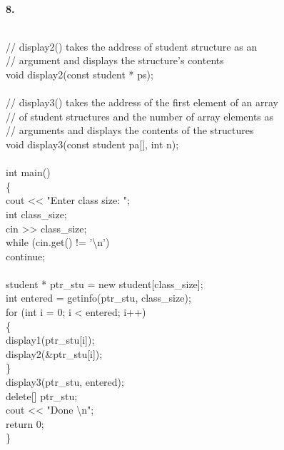 \documentclass[10 pt]{amsart}
\newlength{\cwidth}
\newenvironment{cpart}[2][\cwidth]
	{\\ \phantom{\qquad}\textbf{#2. }\begin{minipage}[t]{#1}}
	{\end{minipage}}
\begin{document}
\begin{cpart}{8}
{\begin{tabbing}
				\\
				// display2() takes the address of student structure as
				an \\
				// argument and displays the structure's contents \\
				void display2(const student * ps); \\
				\\
				// display3() takes the address of the first element
				of an array \\
				// of student structures and the number of array
				elements as \\
				// arguments and displays the contents of the structures \\
				void display3(const student pa[], int n); \\
				\\
				int main() \\
				\{ \\
				\>		cout << "Enter class size: "; \\
				\> 	int class\_size; \\
				\> 	cin >> class\_size; \\
				\> 	while (cin.get() != '\textbackslash n') \\
				\> \> 	continue; \\
				\\
				\> 	student * ptr\_stu = new student[class\_size]; \\
				\> 	int entered = getinfo(ptr\_stu, class\_size); \\
				\> 	for (int i = 0; i < entered; i++) \\
				\> 	\{ \\
				\> \> 	display1(ptr\_stu[i]); \\
				\> \> 	display2(\&ptr\_stu[i]); \\
				\> 	\} \\
				\> display3(ptr\_stu, entered); \\
				\> delete[] ptr\_stu; \\
				\> cout << "Done \textbackslash n"; \\
				\> return 0; \\
				\}
			\end{tabbing}
		}
	\end{cpart}
	\vspace{2ex}
\end{document}
